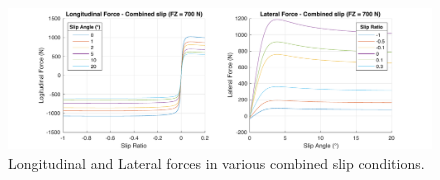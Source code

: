 \begin{figure}[ht]
  \centering
  \includegraphics[width=\textwidth]{figures/tyremodel}
  \caption{Longitudinal and Lateral forces in various combined slip conditions.}
  \label{tyreplots}
\end{figure}
